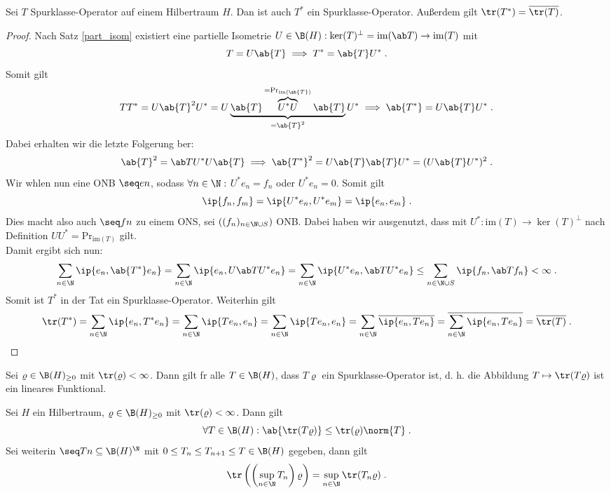 \begin{theorem}
	Sei $T$ Spurklasse-Operator auf einem Hilbertraum $H$. Dan ist auch $T^*$ ein Spurklasse-Operator. Au\ss{}erdem gilt \(\tr(T^*) = \overline{\tr(T)}\).
\end{theorem}
\begin{proof}
	Nach Satz \ref{part_isom} existiert eine partielle Isometrie \(U\in\B(H): \ker(T)^\perp = \text{im}(\ab T) \to \text{im}(T)\) mit
	\[T = U\ab{T} \implies T^* = \ab{T}U^*\;.\]
	Somit gilt 
	\[TT^* = U\ab{T}^2 U^* = U\underbrace{\ab{T}\overbrace{U^* U}^{=\text{Pr}_{\text{im}(\ab{T})}} \ab{T}}_{=\ab{T}^2} U^* \implies \ab{T^*} = U\ab{T} U^*\;.\]
	Dabei erhalten wir die letzte Folgerung \us ber: 
	\[\ab{T}^2 = \ab T U^* U \ab{T} \implies \ab{T^*}^2 = U\ab{T}\ab{T}U^* = (U\ab{T}U^*)^2\;.\]
	Wir w\as hlen nun eine ONB \(\seq en\), sodass \(\forall n \in\N:\) \(U^* e_n = f_n\) oder \(U^* e_n = 0\). Somit gilt
	\[\ip{f_n, f_m} = \ip{U^* e_n, U^* e_m} = \ip{e_n, e_m} \;.\]
	Dies macht also auch \(\seq f n\) zu einem ONS, sei \(((f_n)_{n\in\N\cup S})\) ONB. Dabei haben wir ausgenutzt, dass mit \(U^*:  \text{im}(T) \to \ker(T)^\perp\) nach Definition \(UU^* = \text{Pr}_{\text{im}(T)}\) gilt.\\
	Damit ergibt sich nun:
	\[\sum_{n\in\N}\ip{e_n, \ab{T^*} e_n} = \sum_{n\in\N}\ip{e_n, U\ab T U^* e_n} = \sum_{n\in\N}\ip{U^* e_n, \ab T U^* e_n} \leq \sum_{n\in\N\cup S} \ip{f_n, \ab T f_n} < \infty\;.\]
	Somit ist \(T^*\) in der Tat ein Spurklasse-Operator. Weiterhin gilt
	\[\tr(T^*) = \sum_{n\in\N} \ip{e_n, T^* e_n} = \sum_{n\in\N}\ip{T e_n, e_n} = \sum_{n\in\N}\ip{Te_n, e_n} = \sum_{n\in\N} \overline{\ip{e_n, T e_n}} = \overline{\sum_{n\in\N}\ip{e_n, Te_n}} = \overline{\tr(T)}\;.\]
\end{proof}

\begin{rem}
	Sei \(\varrho\in \B(H)_{\geq 0}\) mit \(\tr(\varrho)<\infty\). Dann gilt f\us r alle \(T \in \B(H)\), dass \(T\varrho\) ein Spurklasse-Operator ist, d. h. die Abbildung \(T\mapsto \tr(T\varrho)\) ist ein lineares Funktional.
\end{rem}

\begin{theorem}
	Sei $H$ ein Hilbertraum, \(\varrho \in \B(H)_{\geq 0}\) mit \(\tr(\varrho) < \infty\). Dann gilt
	\[\forall T\in \B(H): \ab{\tr(T\varrho)} \leq \tr(\varrho) \norm{T}\;.\]
	Sei weiterin \(\seq Tn \subseteq \B(H)^\N\) mit \(0\leq T_n\leq T_{n+1} \leq T\in \B(H)\) gegeben, dann gilt
	\[\tr\left(\left(\sup_{n\in\N}T_n\right)\varrho\right) = \sup_{n\in\N} \tr(T_n\varrho)\;.\] 
\end{theorem}

